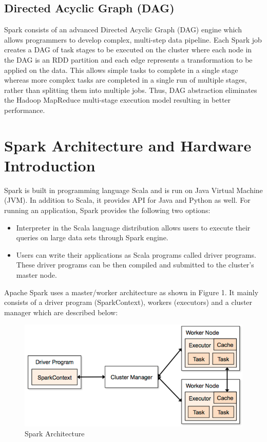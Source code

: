 \documentclass[sigconf]{acmart}
\begin{document}
\subsection{Directed Acyclic Graph (DAG)} 
Spark consists of an advanced Directed Acyclic Graph (DAG) engine which allows programmers to develop complex, multi-step data pipeline\cite{spark_a1}. Each Spark job creates a DAG of task stages to be executed on the cluster where each node in the DAG is an RDD partition and each edge represents a transformation to be applied on the data. This allows simple tasks to complete in a single stage whereas more complex tasks are completed in a single run of multiple stages, rather than splitting them into multiple jobs\cite{verma2016big_p3}. Thus, DAG abstraction eliminates the Hadoop MapReduce multi-stage execution model resulting in better performance\cite{spark_a2}.

\section{Spark Architecture and Hardware Introduction}
Spark is built in programming language Scala and is run on Java Virtual Machine (JVM). In addition to Scala, it provides API for Java and Python as well. For running an application, Spark provides the following two options\cite{verma2016big_p3}:
\begin{itemize}
	\item Interpreter in the Scala language distribution allows users to execute their queries on large data sets through Spark engine. 
	\item Users can write their applications as Scala programs called driver programs. These driver programs can be then compiled and submitted to the cluster's master node.
\end{itemize}

Apache Spark uses a master/worker architecture as shown in Figure 1. It mainly consists of a driver program (SparkContext), workers (executors) and a cluster manager which are described below\cite{spark_a2}: 

\begin{figure}
\includegraphics{images/spark-architecture}
\caption{Spark Architecture\cite{img_arch}}
\label{Figure 1}
\end{figure}
\end{document}
